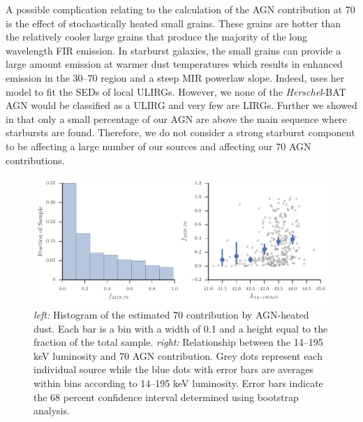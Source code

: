 \documentclass[fleqn, usenatbib]{mnras}
\newcommand{\herschel}{\emph{Herschel}}
\begin{document}
{\color{red}A possible complication relating to the calculation of the AGN contribution at 70 \micron{} is the effect of stochastically heated small grains. These grains are hotter than the relatively cooler large grains that produce the majority of the long wavelength FIR emission. In starburst galaxies, the small grains can provide a large amount emission at warmer dust temperatures which results in enhanced emission in the 30--70 \micron{} region and a steep MIR powerlaw slope. Indeed, \citet{Casey:2012jl} uses her model to fit the SEDs of local ULIRGs. However, we none of the \herschel-BAT AGN would be classified as a ULIRG and very few are LIRGs. Further we showed in \citet{Shimizu:2015xo} that only a small percentage of our AGN are above the main sequence where starbursts are found. Therefore, we do not consider a strong starburst component to be affecting a large number of our sources and affecting our 70 \micron{} AGN contributions.}
 

\begin{figure}
\includegraphics{figures/pacs_AGN_contribution}
\caption{\textit{left:} Histogram of the estimated 70 \micron{} contribution by AGN-heated dust. Each bar is a bin with a width of 0.1 and a height equal to the fraction of the total sample. \textit{right:} Relationship between the 14--195 keV luminosity and 70 \micron{} AGN contribution. Grey dots represent each individual source while the blue dots with error bars are averages within bins according to 14--195 keV luminosity. Error bars indicate the 68 percent confidence interval determined using bootstrap analysis.\label{fig:70um_agn_contribution}}
\end{figure}
\end{document}
